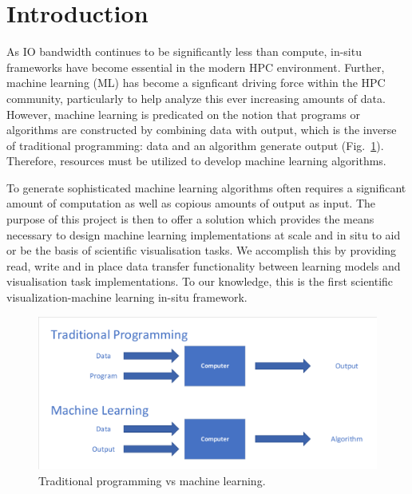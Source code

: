 \section{Introduction}
As IO bandwidth continues to be significantly less than compute, in-situ frameworks have become essential in the modern HPC environment. Further, machine learning (ML) has become a signficant driving force within the HPC community, particularly to help analyze this ever increasing amounts of data. However, machine learning is predicated on the notion that programs or algorithms are constructed by combining data with output, which is the inverse of traditional programming: data and an algorithm generate output (Fig.~\ref{fig:ml-vs-trad}). Therefore, resources must be utilized to develop machine learning algorithms. 

To generate sophisticated machine learning algorithms often requires a significant amount of computation as well as copious amounts of output as input. The purpose of this project is then to offer a solution which provides the means necessary to design machine learning implementations at scale and in situ to aid or be the basis of scientific visualisation tasks. We accomplish this by providing read, write and in place data transfer functionality between learning models and visualisation task implementations. To our knowledge, this is the first scientific visualization-machine learning in-situ framework.

\begin{figure}
    \includegraphics[width=\linewidth]{ML-data-output-program}
    \caption{Traditional programming vs machine learning.}
    \label{fig:ml-vs-trad}
  \end{figure}

